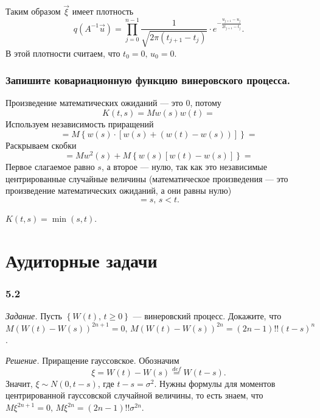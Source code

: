 Таким образом $ \vec{ \xi }$ имеет плотность
$$q \left( A^{-1} \vec{u} \right) =
  \prod \limits_{j = 0}^{n - 1}
    \frac{1}{ \sqrt{2 \pi \left( t_{j + 1} - t_j \right) }} \cdot e^{-\frac{u_{j + 1} - u_j}{2t_{j + 1} - t_j}}.$$
В этой плотности считаем, что $t_0 = 0, \, u_0 = 0$.

\subsubsection*{Запишите ковариационную функцию винеровского процесса.}

Произведение математических ожиданий --- это 0, потому
$$K \left( t, s \right) =
  Mw \left( s \right) w \left( t \right) =$$
Используем независимость приращений
$$= M \left\{
    w \left( s \right) \cdot
    \left[ w \left( s \right) + \left( w \left( t \right) - w \left( s \right) \right) \right]
  \right\} =$$
Раскрываем скобки
$$= Mw^2 \left(s \right) +
  M \left\{ w \left( s \right) \left[ w \left( t \right) - w \left( s \right) \right] \right\} =$$
Первое слагаемое равно $s$, а второе --- нулю,
так как это независимые центрированные случайные величины (математическое произведения ---
это произведение математических ожиданий, а они равны нулю)
$$= s, \,
  s < t.$$

$K \left( t, s \right) = \min \left( s, t \right) $.

\section*{Аудиторные задачи}

\subsubsection*{5.2}

\textit{Задание.}
Пусть $ \left\{ W \left( t \right), \, t \geq 0 \right\} $ --- винеровский процесс.
Докажите, что
$M \left( W \left( t \right) - W \left( s \right) \right)^{2n + 1} = 0, \,
  M \left( W \left( t \right) - W \left( s \right) \right)^{2n} =
  \left( 2n - 1 \right)!! \left( t - s \right)^n$.

\textit{Решение.}
Приращение гауссовское.
Обозначим
$$ \xi =
  W \left( t \right) - W \left( s \right) \overset{def}{=}
  W \left( t - s \right).$$
Значит, $ \xi \sim N \left( 0, t - s \right) $, где $t - s = \sigma^2$.
Нужны формулы для моментов центрированной гауссовской случайной величины,
то есть знаем, что
$M \xi^{2n + 1} = 0, \,
  M \xi^{2n} = \left( 2n - 1 \right)!! \sigma^{2n}$.

